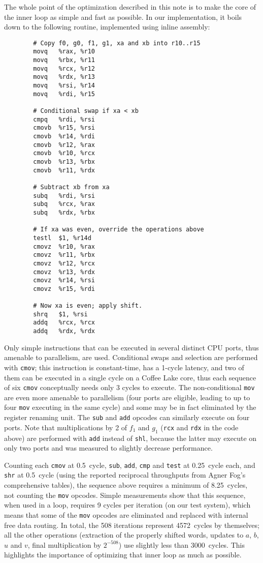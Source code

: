 \documentclass{llncs}
\begin{document}
The whole point of the optimization described in this note is to make
the core of the inner loop as simple and fast as possible. In our
implementation, it boils down to the following routine, implemented
using inline assembly:
\begin{verbatim}
        # Copy f0, g0, f1, g1, xa and xb into r10..r15
        movq   %rax, %r10
        movq   %rbx, %r11
        movq   %rcx, %r12
        movq   %rdx, %r13
        movq   %rsi, %r14
        movq   %rdi, %r15

        # Conditional swap if xa < xb
        cmpq   %rdi, %rsi
        cmovb  %r15, %rsi
        cmovb  %r14, %rdi
        cmovb  %r12, %rax
        cmovb  %r10, %rcx
        cmovb  %r13, %rbx
        cmovb  %r11, %rdx

        # Subtract xb from xa
        subq   %rdi, %rsi
        subq   %rcx, %rax
        subq   %rdx, %rbx

        # If xa was even, override the operations above
        testl  $1, %r14d
        cmovz  %r10, %rax
        cmovz  %r11, %rbx
        cmovz  %r12, %rcx
        cmovz  %r13, %rdx
        cmovz  %r14, %rsi
        cmovz  %r15, %rdi

        # Now xa is even; apply shift.
        shrq   $1, %rsi
        addq   %rcx, %rcx
        addq   %rdx, %rdx
\end{verbatim}
Only simple instructions that can be executed in several distinct CPU
ports, thus amenable to parallelism, are used. Conditional swaps and
selection are performed with \verb+cmov+; this instruction is
constant-time, has a 1-cycle latency, and two of them can be executed in
a single cycle on a Coffee Lake core, thus each sequence of six
\verb+cmov+ conceptually needs only 3 cycles to execute. The
non-conditional \verb+mov+ are even more amenable to parallelism (four
ports are eligible, leading to up to four \verb+mov+ executing in the
same cycle) and some may be in fact eliminated by the register renaming
unit. The \verb+sub+ and \verb+add+ opcodes can similarly execute on
four ports. Note that multiplications by 2 of $f_1$ and $g_1$
(\verb+rcx+ and \verb+rdx+ in the code above) are performed with
\verb+add+ instead of \verb+shl+, because the latter may execute on only
two ports and was measured to slightly decrease performance.

Counting each \verb+cmov+ at 0.5~cycle, \verb+sub+, \verb+add+,
\verb+cmp+ and \verb+test+ at 0.25~cycle each, and \verb+shr+ at
0.5~cycle (using the reported reciprocal throughputs from Agner Fog's
comprehensive tables\cite{FogTables}), the sequence above requires a
minimum of 8.25~cycles, not counting the \verb+mov+ opcodes. Simple
measurements show that this sequence, when used in a loop, requires 9
cycles per iteration (on our test system), which means that some of the
\verb+mov+ opcodes are eliminated and replaced with internal free data
routing. In total, the 508 iterations represent 4572~cycles by
themselves; all the other operations (extraction of the properly shifted
words, updates to $a$, $b$, $u$ and $v$, final multiplication by
$2^{-508}$) use slightly less than 3000~cycles. This highlights the
importance of optimizing that inner loop as much as possible.
\end{document}
